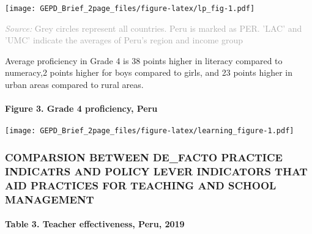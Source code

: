 \documentclass[twocolumn]{article}
\let\oldparagraph\paragraph
\renewcommand{\paragraph}[1]{\oldparagraph{#1}\mbox{}}
\begin{document}
\texttt{[image: GEPD\_Brief\_2page\_files/figure-latex/lp\_fig-1.pdf]}

{\scriptsize
    \textcolor{darkgray}{\textit{Source:} Grey circles represent all countries. Peru is marked as PER. 'LAC' and 'UMC' indicate the averages of Peru's region and income group}
  }

Average proficiency in Grade 4 is 38 points higher in literacy compared
to numeracy,2 points higher for boys compared to girls, and 23 points
higher in urban areas compared to rural areas.\\
\vfill\null

\hypertarget{figure-3.-grade-4-proficiency-peru}{%
\paragraph{Figure 3. Grade 4 proficiency,
Peru}\label{figure-3.-grade-4-proficiency-peru}}

\texttt{[image: GEPD\_Brief\_2page\_files/figure-latex/learning\_figure-1.pdf]}

\hypertarget{comparsion-between-de_facto-practice-indicatrs-and-policy-lever-indicators-that-aid-practices-for-teaching-and-school-management}{%
\subsubsection{\texorpdfstring{\textbf{COMPARSION BETWEEN DE\_FACTO
PRACTICE INDICATRS AND POLICY LEVER INDICATORS THAT AID PRACTICES FOR
TEACHING AND SCHOOL
MANAGEMENT}}{COMPARSION BETWEEN DE\_FACTO PRACTICE INDICATRS AND POLICY LEVER INDICATORS THAT AID PRACTICES FOR TEACHING AND SCHOOL MANAGEMENT}}\label{comparsion-between-de_facto-practice-indicatrs-and-policy-lever-indicators-that-aid-practices-for-teaching-and-school-management}}

\hypertarget{table-3.-teacher-effectiveness-peru-2019}{%
\paragraph{Table 3. Teacher effectiveness, Peru,
2019}\label{table-3.-teacher-effectiveness-peru-2019}}
\end{document}
